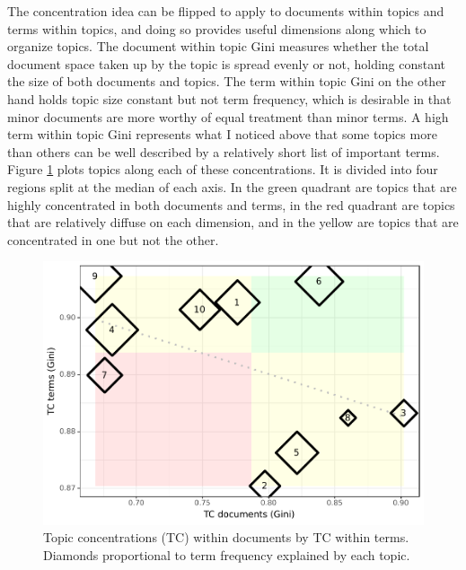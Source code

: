 \documentclass[]{book}
\theoremstyle{definition}
\theoremstyle{definition}
\theoremstyle{definition}
\theoremstyle{remark}
\begin{document}
The concentration idea can be flipped to apply to documents within
topics and terms within topics, and doing so provides useful dimensions
along which to organize topics. The document within topic Gini measures
whether the total document space taken up by the topic is spread evenly
or not, holding constant the size of both documents and topics. The term
within topic Gini on the other hand holds topic size constant but not
term frequency, which is desirable in that minor documents are more
worthy of equal treatment than minor terms. A high term within topic
Gini represents what I noticed above that some topics more than others
can be well described by a relatively short list of important terms.
Figure \ref{fig:top-gini} plots topics along each of these
concentrations. It is divided into four regions split at the median of
each axis. In the green quadrant are topics that are highly concentrated
in both documents and terms, in the red quadrant are topics that are
relatively diffuse on each dimension, and in the yellow are topics that
are concentrated in one but not the other.

\begin{figure}

{\centering \includegraphics[width=0.9\linewidth]{03_files/figure-latex/top-gini-1} 

}

\caption{Topic concentrations (TC) within documents by TC within terms. Diamonds proportional to term frequency explained by each topic.}\label{fig:top-gini}
\end{figure}
\end{document}
